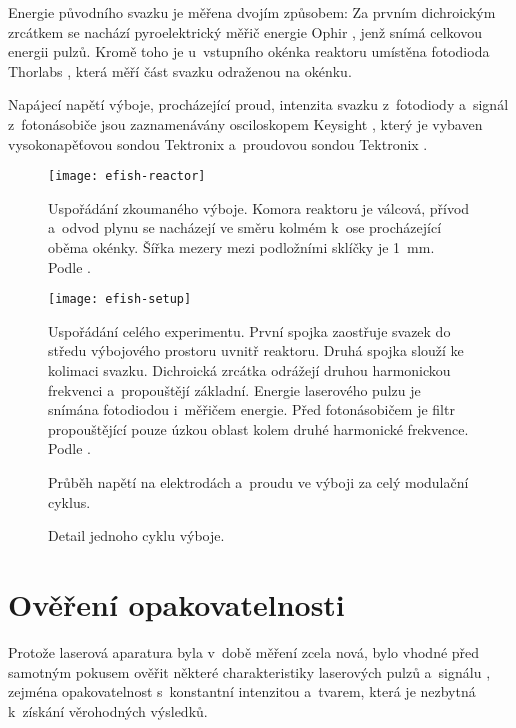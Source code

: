 Energie původního svazku je měřena dvojím způsobem:
Za prvním dichroickým zrcátkem se nachází pyroelektrický měřič energie
Ophir , jenž snímá celkovou energii pulzů.
Kromě toho je u~vstupního okénka reaktoru umístěna fotodioda
Thorlabs , která měří část svazku odraženou na okénku.

Napájecí napětí výboje, procházející proud, intenzita svazku z~fotodiody
a~signál \EFISH{} z~fotonásobiče jsou zaznamenávány osciloskopem
Keysight ,
který je vybaven vysokonapěťovou sondou Tektronix 
a~proudovou sondou Tektronix .

\begin{figure}
	\texttt{[image: efish-reactor]}
	\caption{Uspořádání zkoumaného výboje.
		Komora reaktoru je válcová, přívod a~odvod plynu se nacházejí
		ve směru kolmém k~ose procházející oběma okénky.
		Šířka mezery mezi podložními sklíčky je \SI{1}{\milli\metre}.
		Podle \cite{efish-nitrogen}.}
	\label{fig:efish-reactor}
\end{figure}

\begin{figure}
	\texttt{[image: efish-setup]}
	\caption{Uspořádání celého experimentu.
	První spojka zaostřuje svazek do středu výbojového prostoru
	uvnitř reaktoru.
	Druhá spojka slouží ke kolimaci svazku.
	Dichroická zrcátka odrážejí druhou harmonickou frekvenci
	a~propouštějí základní.
	Energie laserového pulzu je snímána fotodiodou i~měřičem energie.
	Před fotonásobičem je filtr propouštějící pouze úzkou oblast
	kolem druhé harmonické frekvence.
	Podle \cite{efish-nitrogen}.}
	\label{fig:efish-setup}
\end{figure}

\begin{figure}[htp]
	\centering
	
	\caption{Průběh napětí na elektrodách a~proudu ve výboji
		za celý modulační cyklus.}
	\label{fig:efish-overview-full}
	\vspace{24pt}
	
	\caption{Detail jednoho cyklu výboje.}
	\label{fig:efish-overview-period}
\end{figure}

\section{Ověření opakovatelnosti}
\label{sec:efish-check}
Protože laserová aparatura byla v~době měření zcela nová,
bylo vhodné před samotným pokusem ověřit některé charakteristiky
laserových pulzů a~signálu \EFISH{},
zejména opakovatelnost s~konstantní intenzitou a~tvarem,
která je nezbytná k~získání věrohodných výsledků.

